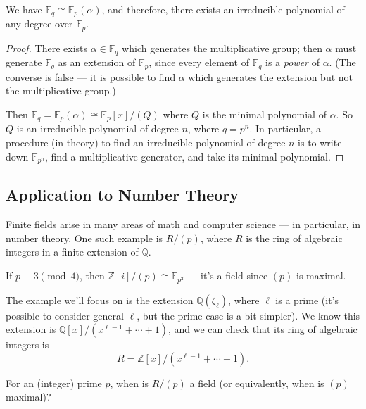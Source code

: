 \begin{corollary}
    We have $\mathbb{F}_q \cong \mathbb{F}_p(\alpha)$, and therefore, there exists an irreducible polynomial of any degree over $\mathbb{F}_p$. 
\end{corollary}

\begin{proof}
    There exists $\alpha \in \mathbb{F}_q$ which generates the multiplicative group; then $\alpha$ must generate $\mathbb{F}_q$ as an extension of $\mathbb{F}_p$, since every element of $\mathbb{F}_q$ is a \emph{power} of $\alpha$. (The converse is false --- it is possible to find $\alpha$ which generates the extension but not the multiplicative group.) 

    Then $\mathbb{F}_q = \mathbb{F}_p(\alpha) \cong \mathbb{F}_p[x]/(Q)$ where $Q$ is the minimal polynomial of $\alpha$. So $Q$ is an irreducible polynomial of degree $n$, where $q = p^n$. In particular, a procedure (in theory) to find an irreducible polynomial of degree $n$ is to write down $\mathbb{F}_{p^n}$, find a multiplicative generator, and take its minimal polynomial.
\end{proof}

\subsection{Application to Number Theory}

Finite fields arise in many areas of math and computer science --- in particular, in number theory. One such example is $R/(p)$, where $R$ is the ring of algebraic integers in a finite extension of $\mathbb{Q}$. 

\begin{example}
    If $p \equiv 3 \pmod{4}$, then $\mathbb{Z}[i]/(p) \cong \mathbb{F}_{p^2}$ --- it's a field since $(p)$ is maximal. 
\end{example}

The example we'll focus on is the extension $\mathbb{Q}(\zeta_\ell)$, where $\ell$ is a prime (it's possible to consider general $\ell$, but the prime case is a bit simpler). We know this extension is $\mathbb{Q}[x]/(x^{\ell - 1} + \cdots + 1)$, and we can check that its ring of algebraic integers is \[R = \mathbb{Z}[x]/(x^{\ell - 1} + \cdots + 1).\] 

\begin{qq}
For an (integer) prime $p$, when is $R/(p)$ a field (or equivalently, when is $(p)$ maximal)?
\end{qq}

